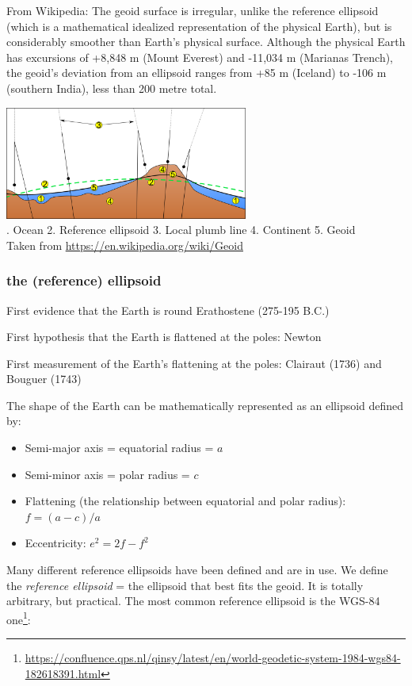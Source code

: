 From Wikipedia: The geoid surface is irregular, unlike the reference ellipsoid 
(which is a mathematical idealized representation of the physical Earth), but 
is considerably smoother than Earth's physical surface. Although the physical Earth has 
excursions of +8,848 m (Mount Everest) and -11,034 m (Marianas Trench), 
the geoid's deviation from an ellipsoid ranges from +85 m (Iceland) to -106 m (southern India), 
less than 200 \si{metre} total.


\begin{center}
\includegraphics[width=8cm]{images/geoid/Geoid}\\
{. Ocean
2. Reference ellipsoid
3. Local plumb line
4. Continent
5. Geoid\\
Taken from \url{https://en.wikipedia.org/wiki/Geoid}}
\end{center}


\subsubsection{the (reference) ellipsoid}

First evidence that the Earth is round Erathostene (275-195 B.C.)

First hypothesis that the Earth is flattened at the poles: Newton

First measurement of the Earth's flattening at the poles: Clairaut (1736) and Bouguer (1743)

The shape of the Earth can be mathematically represented as an ellipsoid defined by:
\begin{itemize}
\item Semi-major axis = equatorial radius = $a$
\item Semi-minor axis = polar radius = $c$
\item Flattening (the relationship between equatorial and polar radius): $f = (a-c)/a$
\item Eccentricity: $e^2 =2f-f^2$
\end{itemize}

Many different reference ellipsoids have been defined and are in use.
We define the {\it reference ellipsoid} = the ellipsoid that best fits the geoid.
It is totally arbitrary, but practical. 
The most common reference ellipsoid is the WGS-84 one\footnote{\url{https://confluence.qps.nl/qinsy/latest/en/world-geodetic-system-1984-wgs84-182618391.html}}:

